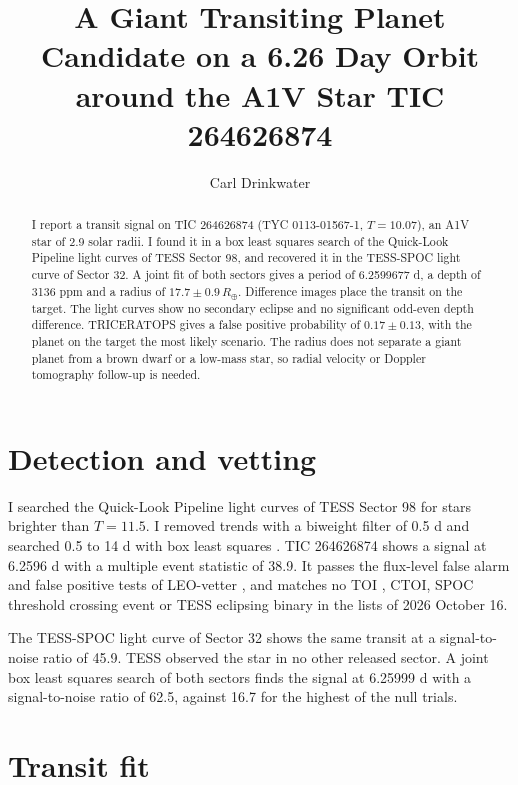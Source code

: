 \documentclass{aastex701}
\begin{document}
\title{A Giant Transiting Planet Candidate on a 6.26 Day Orbit around the A1V Star TIC 264626874}

\author[0000-0000-0000-0000]{Carl Drinkwater}

\begin{abstract}
I report a transit signal on TIC 264626874 (TYC 0113-01567-1, $T=10.07$), an A1V star of 2.9 solar radii.
I found it in a box least squares search of the Quick-Look Pipeline light curves of TESS Sector 98, and recovered it in
the TESS-SPOC light curve of Sector 32. A joint fit of both sectors gives a period of 6.2599677 d, a depth of 3136 ppm
and a radius of $17.7 \pm 0.9\,R_\oplus$. Difference images place the transit on the target. The light curves show no
secondary eclipse and no significant odd-even depth difference. TRICERATOPS gives a false positive probability of
$0.17 \pm 0.13$, with the planet on the target the most likely scenario. The radius does not separate a giant planet from
a brown dwarf or a low-mass star, so radial velocity or Doppler tomography follow-up is needed.
\end{abstract}

\section{Detection and vetting}

I searched the Quick-Look Pipeline \citep[QLP;][]{huang2020a,huang2020b,kunimoto2021} light curves of TESS
\citep{ricker2015} Sector 98 for stars brighter than $T=11.5$. I removed trends with a biweight filter of 0.5 d
\citep{hippke2019} and searched 0.5 to 14 d with box least squares \citep{kovacs2002}. TIC 264626874 \citep{stassun2019}
shows a signal at 6.2596 d with a multiple event statistic of 38.9. It passes the flux-level false alarm and false
positive tests of LEO-vetter \citep{kunimoto2025}, and matches no TOI \citep{guerrero2021}, CTOI, SPOC threshold
crossing event or TESS eclipsing binary \citep{prsa2022} in the lists of 2026 October 16.

The TESS-SPOC light curve of Sector 32 \citep{caldwell2020} shows the same transit at a signal-to-noise ratio of 45.9.
TESS observed the star in no other released sector. A joint box least squares search of both sectors finds the
signal at 6.25999 d with a signal-to-noise ratio of 62.5, against 16.7 for the highest of the null trials.

\section{Transit fit}
\end{document}
